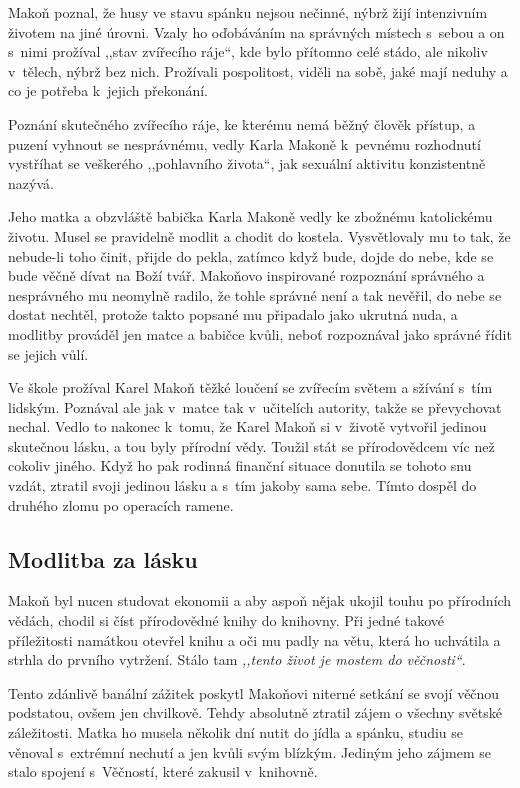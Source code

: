 Makoň poznal, že husy ve stavu spánku nejsou nečinné, nýbrž žijí intenzivním
životem na jiné úrovni. Vzaly ho oďobáváním na správných místech s~sebou a on
s~nimi prožíval ,,stav zvířecího ráje``, kde bylo přítomno celé stádo, ale
nikoliv v~tělech, nýbrž bez nich. Prožívali pospolitost, viděli na sobě, jaké
mají neduhy a co je potřeba k~jejich překonání.

Poznání skutečného zvířecího ráje, ke kterému nemá běžný člověk přístup, a
puzení vyhnout se nesprávnému, vedly Karla Makoně k~pevnému rozhodnutí vystříhat
se veškerého ,,pohlavního života``, jak sexuální aktivitu konzistentně nazývá.

Jeho matka a obzvláště babička Karla Makoně vedly ke zbožnému katolickému
životu. Musel se pravidelně modlit a chodit do kostela. Vysvětlovaly mu to tak,
že nebude-li toho činit, přijde do pekla, zatímco když bude, dojde do nebe, kde
se bude věčně dívat na Boží tvář. Makoňovo inspirované rozpoznání správného a
nesprávného mu neomylně radilo, že tohle správné není a tak nevěřil, do nebe se
dostat nechtěl, protože takto popsané mu připadalo jako ukrutná nuda, a modlitby
prováděl jen matce a babičce kvůli, neboť rozpoznával jako správné řídit se
jejich vůlí.

Ve škole prožíval Karel Makoň těžké loučení se zvířecím světem a sžívání s~tím
lidským. Poznával ale jak v~matce tak v~učitelích autority, takže se převychovat
nechal. Vedlo to nakonec k~tomu, že Karel Makoň si v~životě vytvořil jedinou
skutečnou lásku, a tou byly přírodní vědy. Toužil stát se přírodovědcem víc než
cokoliv jiného. Když ho pak rodinná finanční situace donutila se tohoto snu
vzdát, ztratil svoji jedinou lásku a s~tím jakoby sama sebe.
Tímto dospěl do druhého zlomu po operacích ramene.

\subsection{Modlitba za lásku}

Makoň byl nucen studovat ekonomii a aby aspoň nějak ukojil touhu po přírodních
vědách, chodil si číst přírodovědné knihy do knihovny. Při jedné takové
příležitosti namátkou otevřel knihu a oči mu padly na větu, která ho uchvátila a
strhla do prvního vytržení. Stálo tam \textit{,,tento život je mostem do
věčnosti``}.

Tento zdánlivě banální zážitek poskytl Makoňovi niterné setkání se svojí věčnou
podstatou, ovšem jen chvilkově. Tehdy absolutně ztratil zájem o všechny světské
záležitosti. Matka ho musela několik dní nutit do jídla a spánku, studiu se
věnoval s~extrémní nechutí a jen kvůli svým blízkým. Jediným jeho zájmem se
stalo spojení s~Věčností, které zakusil v~knihovně.

